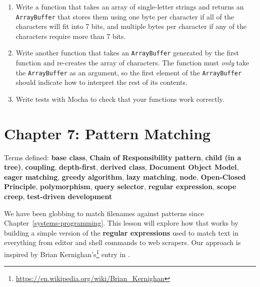 \documentclass[krantzl]{krantz}
\newcommand{\chapref}[1]{Chapter~\ref{#1}}
\newcommand{\glossref}[1]{\textbf{#1}}
\newcommand{\hreffoot}[2]{{#1}\footnote{\href{#2}{#2}}}
\begin{document}
\begin{enumerate}

\item 

Write a function that takes an array of single-letter strings
    and returns an \texttt{ArrayBuffer} that stores them using one byte per character
    if all of the characters will fit into 7 bits,
    and multiple bytes per character if any of the characters require more than 7 bits.



\item 

Write another function that takes an \texttt{ArrayBuffer} generated by the first function
    and re-creates the array of characters.
    The function must \emph{only} take the \texttt{ArrayBuffer} as an argument,
    so the first element of the \texttt{ArrayBuffer} should indicate
    how to interpret the rest of its contents.



\item 

Write tests with Mocha to check that your functions work correctly.



\end{enumerate}

\chapter{Chapter 7: Pattern Matching}\label{pattern-matching}


\noindent 
    Terms defined:
    \glossref{base class}, \glossref{Chain of Responsibility pattern}, \glossref{child (in a tree)}, \glossref{coupling}, \glossref{depth-first}, \glossref{derived class}, \glossref{Document Object Model}, \glossref{eager matching}, \glossref{greedy algorithm}, \glossref{lazy matching}, \glossref{node}, \glossref{Open-Closed Principle}, \glossref{polymorphism}, \glossref{query selector}, \glossref{regular expression}, \glossref{scope creep}, \glossref{test-driven development}



We have been globbing to match filenames against patterns since \chapref{systems-programming}.
This lesson will explore how that works
by building a simple version of the \glossref{regular expressions}
used to match text in everything from editor and shell commands to web scrapers.
Our approach is inspired by \hreffoot{Brian Kernighan's}{https://en.wikipedia.org/wiki/Brian\_Kernighan} entry
in \cite{Oram2007}.
\end{document}
